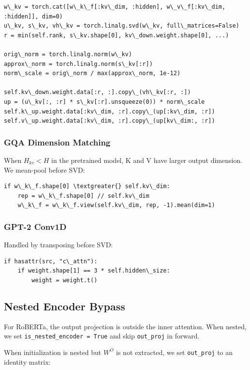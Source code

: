 \begin{lstlisting}
w\_kv = torch.cat([w\_k\_f[:kv\_dim, :hidden], w\_v\_f[:kv\_dim, :hidden]], dim=0)
u\_kv, s\_kv, vh\_kv = torch.linalg.svd(w\_kv, full\_matrices=False)
r = min(self.rank, s\_kv.shape[0], kv\_down.weight.shape[0], ...)

orig\_norm = torch.linalg.norm(w\_kv)
approx\_norm = torch.linalg.norm(s\_kv[:r])
norm\_scale = orig\_norm / max(approx\_norm, 1e-12)

self.kv\_down.weight.data[:r, :].copy\_(vh\_kv[:r, :])
up = (u\_kv[:, :r] * s\_kv[:r].unsqueeze(0)) * norm\_scale
self.k\_up.weight.data[:kv\_dim, :r].copy\_(up[:kv\_dim, :r])
self.v\_up.weight.data[:kv\_dim, :r].copy\_(up[kv\_dim:, :r])
\end{lstlisting}

\subsubsection{GQA Dimension Matching}

When $H_{kv} < H$ in the pretrained model, K and V have larger output 
dimension. We mean-pool before SVD:

\begin{lstlisting}
if w\_k\_f.shape[0] \textgreater{} self.kv\_dim:
    rep = w\_k\_f.shape[0] // self.kv\_dim
    w\_k\_f = w\_k\_f.view(self.kv\_dim, rep, -1).mean(dim=1)
\end{lstlisting}

\subsubsection{GPT-2 Conv1D}

Handled by transposing before SVD:

\begin{lstlisting}
if hasattr(src, "c\_attn"):
    if weight.shape[1] == 3 * self.hidden\_size:
        weight = weight.t()
\end{lstlisting}

\subsection{Nested Encoder Bypass}

For RoBERTa, the output projection is outside the inner attention. When 
nested, we set \texttt{is\_nested\_encoder = True} and skip \texttt{out\_proj} in forward.

When initialization is nested but $W^O$ is not extracted, we set 
\texttt{out\_proj} to an identity matrix:

